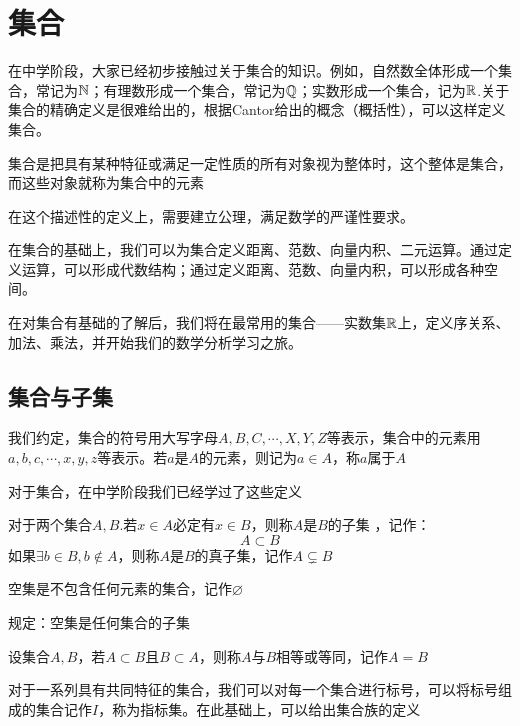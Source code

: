 \chapter{集合}

在中学阶段，大家已经初步接触过关于集合的知识。例如，自然数全体形成一个集合，常记为$\mathbb{N}$；有理数形成一个集合，常记为$\mathbb{Q}$；实数形成一个集合，记为$\mathbb{R}$.关于集合的精确定义是很难给出的，根据Cantor给出的概念（概括性），可以这样定义集合。

\begin{definition}
    集合是把具有某种特征或满足一定性质的所有对象视为整体时，这个整体是集合，而这些对象就称为集合中的元素
\end{definition}

在这个描述性的定义上，需要建立公理，满足数学的严谨性要求。

在集合的基础上，我们可以为集合定义距离、范数、向量内积、二元运算。通过定义运算，可以形成代数结构；通过定义距离、范数、向量内积，可以形成各种空间。

在对集合有基础的了解后，我们将在最常用的集合——实数集$\mathbb{R}$上，定义序关系、加法、乘法，并开始我们的数学分析学习之旅。

\section{集合与子集}

我们约定，集合的符号用大写字母$A,B,C,\cdots,X,Y,Z$等表示，集合中的元素用$a,b,c,\cdots,x,y,z$等表示。若$a$是$A$的元素，则记为$a \in A$，称$a$属于$A$

对于集合，在中学阶段我们已经学过了这些定义

\begin{definition}[子集]
    对于两个集合$A,B$.若$x \in A$必定有$x \in B$，则称$A$是$B$的子集 ，记作：
    \[ A\subset B \]
    如果$\exists b \in B, b \notin A$，则称$A$是$B$的真子集，记作$A\subsetneq B$
\end{definition}

\begin{definition}[空集]
    空集是不包含任何元素的集合，记作$\varnothing $

    规定：空集是任何集合的子集
\end{definition}

\begin{definition}
    设集合$A,B$，若$A\subset B$且$B \subset A$，则称$A$与$B$相等或等同，记作$A=B$
\end{definition}

对于一系列具有共同特征的集合，我们可以对每一个集合进行标号，可以将标号组成的集合记作$I$，称为指标集。在此基础上，可以给出集合族的定义

